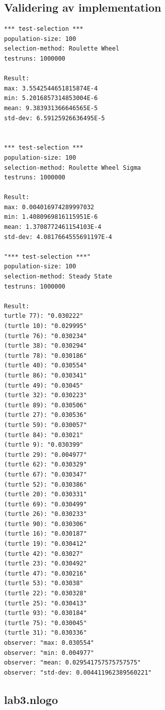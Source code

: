 \documentclass[titlepage, a4paper, 12pt]{article}
\begin{document}
\subsection{Validering av implementation}\label{app:validering}
\begin{footnotesize}
\begin{verbatim}
*** test-selection ***
population-size: 100
selection-method: Roulette Wheel
testruns: 1000000

Result:
max: 3.5542544651815874E-4
min: 5.2016857314853004E-6
mean: 9.383931366646565E-5
std-dev: 6.59125926636495E-5


*** test-selection ***
population-size: 100
selection-method: Roulette Wheel Sigma
testruns: 1000000

Result:
max: 0.004016974289997032
min: 1.4080969816115951E-6
mean: 1.3708772461154103E-4
std-dev: 4.0817664555691197E-4

"*** test-selection ***"
population-size: 100
selection-method: Steady State
testruns: 1000000

Result:
turtle 77): "0.030222"
(turtle 10): "0.029995"
(turtle 76): "0.030234"
(turtle 38): "0.030294"
(turtle 78): "0.030186"
(turtle 40): "0.030554"
(turtle 86): "0.030341"
(turtle 49): "0.03045"
(turtle 32): "0.030223"
(turtle 89): "0.030506"
(turtle 27): "0.030536"
(turtle 59): "0.030057"
(turtle 84): "0.03021"
(turtle 9): "0.030399"
(turtle 29): "0.004977"
(turtle 62): "0.030329"
(turtle 67): "0.030347"
(turtle 52): "0.030386"
(turtle 20): "0.030331"
(turtle 69): "0.030499"
(turtle 26): "0.030233"
(turtle 90): "0.030306"
(turtle 16): "0.030187"
(turtle 19): "0.030412"
(turtle 42): "0.03027"
(turtle 23): "0.030492"
(turtle 47): "0.030216"
(turtle 53): "0.03038"
(turtle 22): "0.030328"
(turtle 25): "0.030413"
(turtle 93): "0.030184"
(turtle 75): "0.030045"
(turtle 31): "0.030336"
observer: "max: 0.030554"
observer: "min: 0.004977"
observer: "mean: 0.029541757575757575"
observer: "std-dev: 0.004411962389560221"
\end{verbatim}
\end{footnotesize}

\subsection{lab3.nlogo}\label{app:lab3.nlogo}
\begin{footnotesize}
  
\end{footnotesize}
\end{document}
